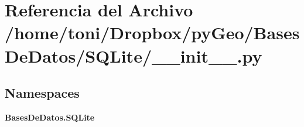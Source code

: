 \section{Referencia del Archivo /home/toni/\-Dropbox/py\-Geo/\-Bases\-De\-Datos/\-S\-Q\-Lite/\-\_\-\-\_\-init\-\_\-\-\_\-.py}
\label{BasesDeDatos_2SQLite_2____init_____8py}
\subsection*{Namespaces}
\begin{DoxyCompactItemize}
\item 
{\bf Bases\-De\-Datos.\-S\-Q\-Lite}
\end{DoxyCompactItemize}
